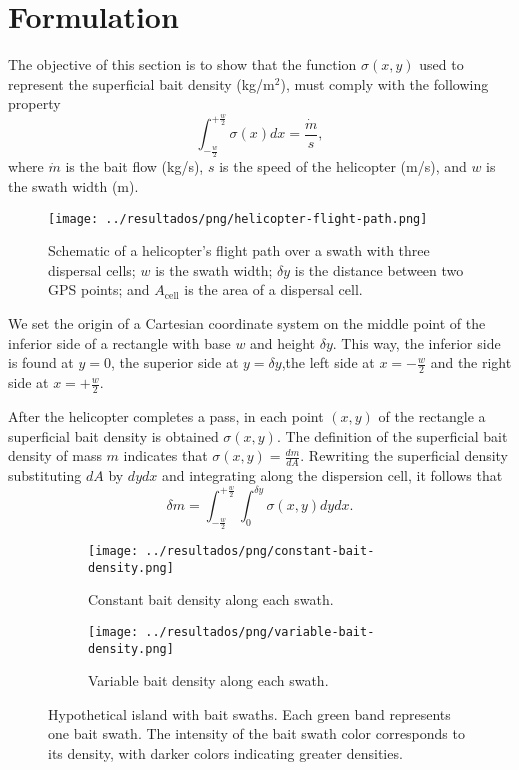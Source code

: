 \section{Formulation}
The objective of this section is to show that the function $\sigma(x,y)$ used to represent the superficial bait density (kg/m$^2$), must comply with the following property
$$\int_{-\frac{w}{2}}^{+\frac{w}{2}} \sigma(x)dx=\frac{\dot{m}}{s},$$
where $\dot{m}$ is the bait flow (kg/s), $s$ is the speed of the helicopter (m/s), and $w$ is the swath width (m).

\begin{figure}[h]
  \centering
  \texttt{[image: ../resultados/png/helicopter-flight-path.png]}
  \caption{Schematic of a helicopter’s flight path over a swath with three
  dispersal cells; $w$ is the swath width; $\delta y$ is the distance between two
  GPS points; and $A_{\mbox{cell}}$ is the area of a dispersal cell.}
  \label{fig:esquemaHelicoptero}
\end{figure}

We set the origin of a Cartesian coordinate system on the middle point of the
inferior side of a rectangle with base $w$ and height $\delta y$. This way, the
inferior side is found at $y=0$, the superior side at $y=\delta y$,the left side
at $x=-\frac{w}{2}$ and the right side at $x=+\frac{w}{2}$.

After the helicopter completes a pass, in each point $(x,y)$ of the rectangle a superficial bait density is obtained $\sigma(x,y)$. The definition of the superficial bait density of mass $m$ indicates that $\sigma(x,y)=\frac{dm}{dA}$. Rewriting the superficial density substituting $dA$ by $dydx$ and integrating along the dispersion cell, it follows that
\begin{equation}
  \delta m=\int_{-\frac{w}{2}}^{+\frac{w}{2}} \int_{0}^{\delta y} \sigma(x,y)dydx.
  \label{eq:masaEsIntegralDobleDeDensidad}
\end{equation}

\begin{figure}
  \centering
  \begin{subfigure}[b]{0.45\textwidth}
    \texttt{[image: ../resultados/png/constant-bait-density.png]}
    \caption{Constant bait density along each swath.}
    \label{fig:densidadConstante}
  \end{subfigure}
  \begin{subfigure}[b]{0.45\textwidth}
    \texttt{[image: ../resultados/png/variable-bait-density.png]}
    \caption{Variable bait density along each swath.}
    \label{fig:densidadVariable}
  \end{subfigure}
  \caption{
  Hypothetical island with bait swaths. Each green band represents one bait swath. The intensity of the bait swath color corresponds to its density, with darker colors indicating greater densities.
  }
\end{figure}


